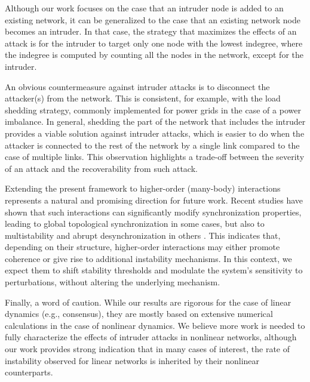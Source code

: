\documentclass[%
 reprint,
 amsmath,amssymb,
 aip,
]{revtex4-2}
\theoremstyle{italichead}
\theoremstyle{definition}
\begin{document}
{Although our work focuses on the case that an intruder node is added to an existing network, it can be generalized to the case that an existing network node becomes an intruder. In that case, the strategy that maximizes the effects of an attack is for the intruder to target only one node with the lowest indegree, where the indegree is computed by counting all the nodes in the network, except for the intruder. 

An obvious countermeasure against intruder attacks is to disconnect the attacker(s) from the network. This is consistent, for example, with the load shedding strategy, commonly implemented for power grids in the case of a power imbalance. %
In general,   shedding the part of the network that includes the intruder provides a viable solution against intruder attacks, which is easier to do when the attacker is connected to the rest of the network by a single link compared to the case of multiple links. This observation highlights a trade-off between the severity of an attack and the recoverability from such attack.

{Extending the present framework to higher-order (many-body) interactions represents a natural and promising direction for future work. Recent studies have shown that such interactions can significantly modify synchronization properties, leading to global topological synchronization in some cases, but also to multistability and abrupt desynchronization in others \cite{carletti2023global, gallo2022synchronization, skardal2019abrupt, millan2020explosive}. This indicates that, depending on their structure, higher-order interactions may either promote coherence or give rise to additional instability mechanisms. In this context, we expect them to shift stability thresholds and modulate the system’s sensitivity to perturbations, without altering the underlying mechanism.}

Finally, a word of caution. While our results are rigorous for the case of linear dynamics (e.g., consensus), they are mostly based on extensive numerical calculations in the case of nonlinear dynamics.  We believe more work is needed to fully characterize the effects of intruder attacks in nonlinear networks, although our work provides strong indication that in many cases of interest, the rate of instability observed for linear networks is inherited by their nonlinear counterparts. 

}
\end{document}
